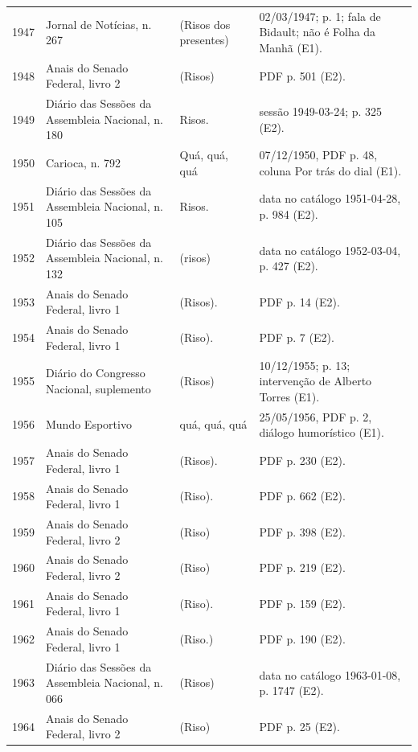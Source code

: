 \begin{longtable}{p{}p{}p{}p{}}
1947 & Jornal de Notícias, n. 267 \cite{jornalnoticias1947} & (Risos dos presentes) & 02/03/1947; p. 1; fala de Bidault; não é Folha da Manhã (E1). \\
1948 & Anais do Senado Federal, livro 2 \cite{anual1948} & (Risos) & PDF p. 501 (E2). \\
1949 & Diário das Sessões da Assembleia Nacional, n. 180 \cite{anual1949} & Risos. & sessão 1949-03-24; p. 325 (E2). \\
1950 & Carioca, n. 792 \cite{anual1950} & Quá, quá, quá & 07/12/1950, PDF p. 48, coluna Por trás do dial (E1). \\
1951 & Diário das Sessões da Assembleia Nacional, n. 105 \cite{anual1951} & Risos. & data no catálogo 1951-04-28, p. 984 (E2). \\
1952 & Diário das Sessões da Assembleia Nacional, n. 132 \cite{anual1952} & (risos) & data no catálogo 1952-03-04, p. 427 (E2). \\
1953 & Anais do Senado Federal, livro 1 \cite{anual1953} & (Risos). & PDF p. 14 (E2). \\
1954 & Anais do Senado Federal, livro 1 \cite{anual1954} & (Riso). & PDF p. 7 (E2). \\
1955 & Diário do Congresso Nacional, suplemento \cite{camara1955} & (Risos) & 10/12/1955; p. 13; intervenção de Alberto Torres (E1). \\
1956 & Mundo Esportivo \cite{anual1956} & quá, quá, quá & 25/05/1956, PDF p. 2, diálogo humorístico (E1). \\
1957 & Anais do Senado Federal, livro 1 \cite{anual1957} & (Risos). & PDF p. 230 (E2). \\
1958 & Anais do Senado Federal, livro 1 \cite{anual1958} & (Riso). & PDF p. 662 (E2). \\
1959 & Anais do Senado Federal, livro 2 \cite{anual1959} & (Riso) & PDF p. 398 (E2). \\
1960 & Anais do Senado Federal, livro 2 \cite{anual1960} & (Riso) & PDF p. 219 (E2). \\
1961 & Anais do Senado Federal, livro 1 \cite{anual1961} & (Riso). & PDF p. 159 (E2). \\
1962 & Anais do Senado Federal, livro 1 \cite{anual1962} & (Riso.) & PDF p. 190 (E2). \\
1963 & Diário das Sessões da Assembleia Nacional, n. 066 \cite{anual1963} & (Risos) & data no catálogo 1963-01-08, p. 1747 (E2). \\
1964 & Anais do Senado Federal, livro 2 \cite{anual1964} & (Riso) & PDF p. 25 (E2). \\

\end{longtable}
